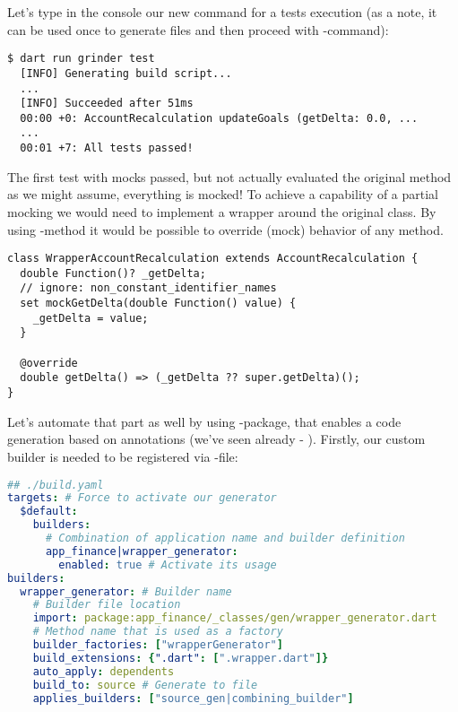 \noindent Let's type in the console our new command for a tests execution (as a note, it can be used once to generate 
files and then proceed with -command):

\begin{lstlisting}[language=terminal]
$ dart run grinder test
  [INFO] Generating build script...
  ...
  [INFO] Succeeded after 51ms
  00:00 +0: AccountRecalculation updateGoals (getDelta: 0.0, ...
  ...
  00:01 +7: All tests passed!
\end{lstlisting}

\noindent The first test with mocks passed, but not actually evaluated the original method as we might assume, 
everything is mocked! To achieve a capability of a partial mocking we would need to implement a wrapper around the 
original class. By using -method it would be possible to override (mock) behavior of any method. 

\begin{lstlisting}
class WrapperAccountRecalculation extends AccountRecalculation {
  double Function()? _getDelta;
  // ignore: non_constant_identifier_names
  set mockGetDelta(double Function() value) {
    _getDelta = value;
  }

  @override
  double getDelta() => (_getDelta ?? super.getDelta)();
}
\end{lstlisting}

\noindent Let's automate that part as well by using -package, that enables a code generation based on 
annotations (we've seen already - ). Firstly, our custom builder is needed to be registered via 
-file:

\begin{lstlisting}[language=yaml]
## ./build.yaml
targets: # Force to activate our generator
  $default:
    builders: 
      # Combination of application name and builder definition
      app_finance|wrapper_generator:
        enabled: true # Activate its usage
builders:
  wrapper_generator: # Builder name
    # Builder file location
    import: package:app_finance/_classes/gen/wrapper_generator.dart
    # Method name that is used as a factory
    builder_factories: ["wrapperGenerator"]
    build_extensions: {".dart": [".wrapper.dart"]}
    auto_apply: dependents
    build_to: source # Generate to file
    applies_builders: ["source_gen|combining_builder"]
\end{lstlisting}

